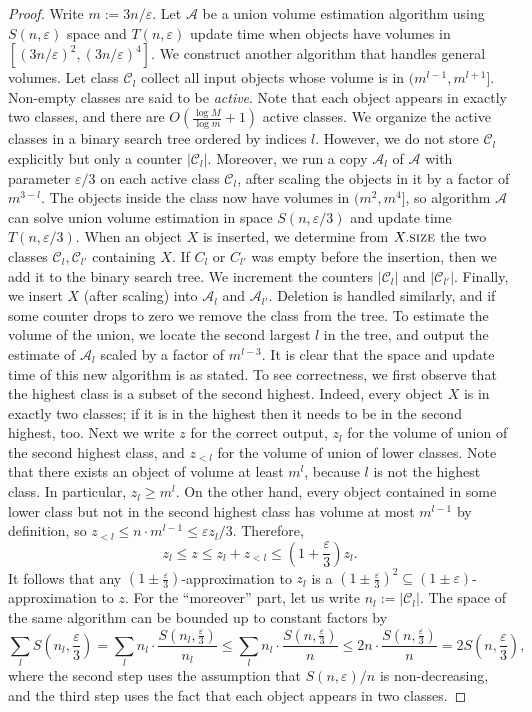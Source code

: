 \documentclass[11pt]{article}
\newcommand{\size}{\textsc{size}}
\newcommand{\Alg}{\mathcal{A}}
\newcommand{\eps}{\varepsilon}
\newcommand{\class}[1]{\mathcal{#1}}
\begin{document}
\begin{proof}
    Write $m := 3n/\eps$. Let $\Alg$ be a union volume estimation algorithm using $S(n,\eps)$ space and $T(n,\eps)$ update time when objects have volumes in $[(3n/\eps)^2, (3n/\eps)^4]$. We construct another algorithm that handles general volumes.
%
    Let class $\class{C}_l$ collect all input objects whose volume is in $(m^{l-1}, m^{l+1}]$. Non-empty classes are said to be \emph{active}. Note that each object appears in exactly two classes, and there are $O(\frac{\log M}{\log m} + 1)$ active classes. We organize the active classes in a binary search tree ordered by indices $l$. However, we do not store $\class{C}_l$ explicitly but only a counter $|\class{C}_l|$. Moreover, we run a copy $\Alg_l$ of $\Alg$ with parameter $\eps/3$ on each active class $\class{C}_l$, after scaling the objects in it by a factor of $m^{3-l}$. The objects inside the class now have volumes in $(m^2, m^4]$, so algorithm $\Alg$ can solve union volume estimation in space $S(n,\eps/3)$ and update time $T(n,\eps/3)$.
%
    When an object $X$ is inserted, we determine from $X.\size$ the two classes $\class{C}_l, \class{C}_{l'}$ containing $X$. If $C_l$ or $C_{l'}$ was empty before the insertion, then we add it to the binary search tree. We increment the counters $|\class{C}_l|$ and $|\class{C}_{l'}|$. Finally, we insert $X$ (after scaling) into $\Alg_l$ and $\Alg_{l'}$. Deletion is handled similarly, and if some counter drops to zero we remove the class from the tree. To estimate the volume of the union, we locate the second largest $l$ in the tree, and output the estimate of $\Alg_l$ scaled by a factor of $m^{l-3}$.
%
    It is clear that the space and update time of this new algorithm is as stated. To see correctness, we first observe that the highest class is a subset of the second highest. Indeed, every object $X$ is in exactly two classes; if it is in the highest then it needs to be in the second highest, too.
    Next we write $z$ for the correct output, $z_l$ for the volume of union of the second highest class, and $z_{<l}$ for the volume of union of lower classes. Note that there exists an object of volume at least $m^l$, because $l$ is not the highest class. In particular, $z_l \geq m^l$. On the other hand, every object contained in some lower class but not in the second highest class has volume at most $m^{l-1}$ by definition, so $z_{<l} \leq n \cdot m^{l-1} \leq \eps z_l/3$. Therefore,
    \[ z_l \leq z \leq z_l + z_{<l} \leq \left( 1+\frac{\eps}{3} \right) z_l. \]
    It follows that any $(1\pm\frac{\eps}{3})$-approximation to $z_l$ is a $(1\pm\frac{\eps}{3})^2 \subseteq(1\pm\eps)$-approximation to $z$.
%
    For the ``moreover'' part, let us write $n_l := |\class{C}_l|$. The space of the same algorithm can be bounded up to constant factors by
    \[
        \sum_l S \left( n_l, \frac{\eps}{3} \right)
        = \sum_l n_l \cdot \frac{S(n_l, \frac{\eps}{3})}{n_l}
        \leq \sum_l n_l \cdot \frac{S(n, \frac{\eps}{3})}{n}
        \leq 2 n \cdot \frac{S(n, \frac{\eps}{3})}{n}
        = 2 S\left( n, \frac{\eps}{3} \right),
    \]
    where the second step uses the assumption that $S(n,\eps)/n$ is non-decreasing, and the third step uses the fact that each object appears in two classes.
\end{proof}
%
\end{document}
